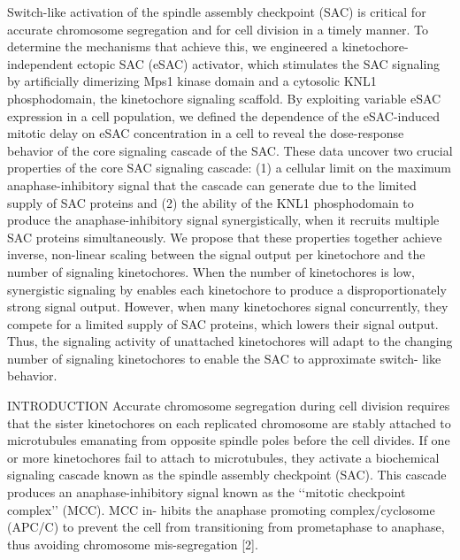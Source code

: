 Switch-like activation of the spindle assembly checkpoint (SAC) is critical for accurate chromosome segregation and for cell division in a timely manner. To determine the mechanisms that achieve this, we engineered a kinetochore-independent ectopic SAC (eSAC) activator, which stimulates the SAC signaling by artificially dimerizing Mps1 kinase domain and a cytosolic KNL1 phosphodomain, the kinetochore signaling scaffold. By exploiting variable eSAC expression in a cell population, we defined the dependence of the eSAC-induced mitotic delay on eSAC concentration in a cell to reveal the dose-response behavior of the core signaling cascade of the SAC. These data uncover two crucial properties of the core SAC signaling cascade: (1) a cellular limit on the maximum anaphase-inhibitory signal that the cascade can generate due to the limited supply of SAC proteins and (2) the ability of the KNL1 phosphodomain to produce the anaphase-inhibitory signal synergistically, when it recruits multiple SAC proteins simultaneously. We propose that these properties together achieve inverse, non-linear scaling between the signal output per kinetochore and the number of signaling kinetochores. When the number of kinetochores is low, synergistic signaling by  enables each kinetochore to produce a disproportionately strong signal output. However, when many kinetochores signal concurrently, they compete for a limited supply of SAC proteins, which lowers their signal output. Thus, the signaling activity of unattached kinetochores will adapt to the changing number of signaling kinetochores to enable the SAC to approximate switch- like behavior.



INTRODUCTION
Accurate chromosome segregation during cell division requires that the sister kinetochores on each replicated chromosome are stably attached to microtubules emanating from opposite spindle poles before the cell divides. If one or more kinetochores fail to attach to microtubules, they activate a biochemical signaling cascade known as the spindle assembly checkpoint (SAC). This cascade produces an anaphase-inhibitory signal known as the ‘‘mitotic checkpoint complex’’ (MCC). MCC in- hibits the anaphase promoting complex/cyclosome (APC/C) to prevent the cell from transitioning from prometaphase to anaphase, thus avoiding chromosome mis-segregation [2].

